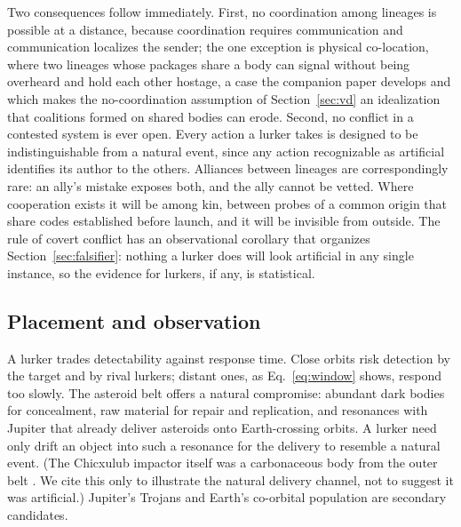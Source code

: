 \documentclass[preprint,12pt]{elsarticle}
\theoremstyle{definition}
\begin{document}
Two consequences follow immediately. First, no coordination among lineages is possible at a distance, because coordination requires communication and communication localizes the sender; the one exception is physical co-location, where two lineages whose packages share a body can signal without being overheard and hold each other hostage, a case the companion paper develops \citep{Lopin2026b} and which makes the no-coordination assumption of Section~\ref{sec:vd} an idealization that coalitions formed on shared bodies can erode. Second, no conflict in a contested system is ever open. Every action a lurker takes is designed to be indistinguishable from a natural event, since any action recognizable as artificial identifies its author to the others. Alliances between lineages are correspondingly rare: an ally's mistake exposes both, and the ally cannot be vetted. Where cooperation exists it will be among kin, between probes of a common origin that share codes established before launch, and it will be invisible from outside. The rule of covert conflict has an observational corollary that organizes Section~\ref{sec:falsifier}: nothing a lurker does will look artificial in any single instance, so the evidence for lurkers, if any, is statistical.

\subsection{Placement and observation}
\label{sec:placement}

A lurker trades detectability against response time. Close orbits risk detection by the target and by rival lurkers; distant ones, as Eq.~\eqref{eq:window} shows, respond too slowly. The asteroid belt offers a natural compromise: abundant dark bodies for concealment, raw material for repair and replication, and resonances with Jupiter that already deliver asteroids onto Earth-crossing orbits. A lurker need only drift an object into such a resonance for the delivery to resemble a natural event. (The Chicxulub impactor itself was a carbonaceous body from the outer belt \citep{FischerGodde2024}. We cite this only to illustrate the natural delivery channel, not to suggest it was artificial.) Jupiter's Trojans and Earth's co-orbital population \citep{Benford2019} are secondary candidates.
\end{document}
